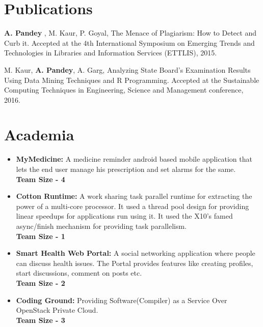 \documentclass[letterpaper]{deedy-resume} %
\begin{document}
\begin{minipage}[t]{0.66\textwidth}
				 \sectionspace %


				 \section{Publications}
				 \vspace{2mm}
				 \begin{tightitemize}
				 \item {\textbf{A. Pandey }, M. Kaur, P. Goyal, The Menace of Plagiarism: How to Detect and Curb it.
					 Accepted at the 4th International Symposium on Emerging Trends and Technologies
						 in Libraries and Information Services (ETTLIS), 2015. }

						 \item {M. Kaur, \textbf{A. Pandey}, A. Garg, Analyzing State Board’s Examination Results Using
							 Data Mining Techniques and R Programming. Accepted at the Sustainable Computing
								 Techniques in Engineering, Science and Management conference, 2016.}

								 \end{tightitemize}

								 \sectionspace %


								 \section{Academia}

								 \begin{itemize}
								 \item {\textbf{MyMedicine:} A medicine reminder android based mobile application that lets the end user manage his prescription and set alarms for the same. \\ \textbf{Team Size - 4}}
								 \item {\textbf{Cotton Runtime: }A work sharing task parallel runtime for extracting the power of a multi-core processor. It used a thread pool design for providing linear speedups for applications run using it. It used the X10’s famed async/finish mechanism for providing task parallelism. \\ \textbf{Team Size - 1}}
								 \item {\textbf{Smart Health Web Portal: } A social networking application where people can discuss health issues. The Portal provides features like creating profiles, start discussions, comment on posts etc.\\ \textbf{Team Size - 2}}
								 \item {\textbf{Coding Ground: } Providing Software(Compiler) as a Service Over OpenStack Private Cloud. \\ \textbf{Team Size - 3}}
								 \end{itemize}


\end{minipage}
\end{document}
